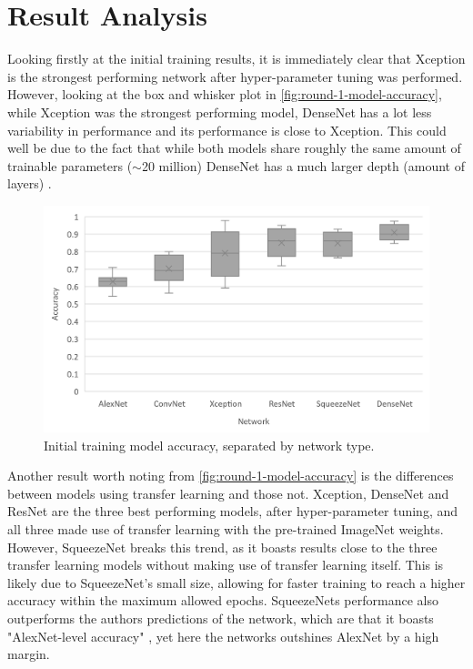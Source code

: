 \section{Result Analysis}
Looking firstly at the initial training results, it is immediately clear that Xception is the strongest performing network after hyper-parameter tuning was performed. However, looking at the box and whisker plot in \autoref{fig:round-1-model-accuracy}, while Xception was the strongest performing model, DenseNet has a lot less variability in performance and its performance is close to Xception. This could well be due to the fact that while both models share roughly the same amount of trainable parameters ($\sim$20 million) DenseNet has a much larger depth (amount of layers) \citep{KerasApp92:online}.

\begin{figure}[H]
    \centering
    \includegraphics[width=\textwidth]{figures/round-1-model-accuracy.png}
    \caption{Initial training model accuracy, separated by network type.}
    \label{fig:round-1-model-accuracy}
\end{figure}

Another result worth noting from \autoref{fig:round-1-model-accuracy} is the differences between models using transfer learning and those not. Xception, DenseNet and ResNet are the three best performing models, after hyper-parameter tuning, and all three made use of transfer learning with the pre-trained ImageNet weights. However, SqueezeNet breaks this trend, as it boasts results close to the three transfer learning models without making use of transfer learning itself. This is likely due to SqueezeNet's small size, allowing for faster training to reach a higher accuracy within the maximum allowed epochs. SqueezeNets performance also outperforms the authors predictions of the network, which are that it boasts "AlexNet-level accuracy" \citep{iandola2016squeezenet}, yet here the networks outshines AlexNet by a high margin.

